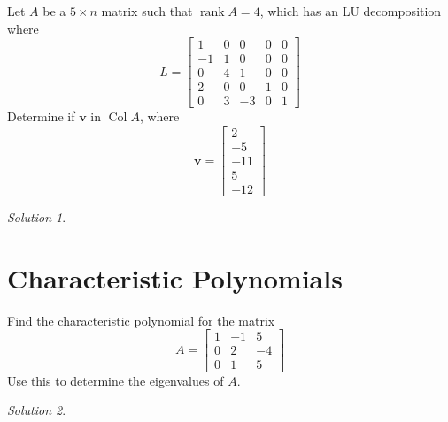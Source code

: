 \documentclass{article}
\newcommand{\vv}[1]{\mathbf{#1}}
\DeclareMathOperator{\col}{Col}
\DeclareMathOperator{\rank}{rank}
\theoremstyle{remark}
\newtheorem*{solution}{Solution}
\begin{document}
Let $A$ be a $5 \times n$ matrix such that $\rank A = 4$, which has an LU decomposition where
\begin{displaymath}
  L =
  \begin{bmatrix}
    1 & 0 & 0 & 0 & 0 \\
    -1 & 1 & 0 & 0 & 0\\
    0 & 4 & 1 & 0 & 0\\
    2 & 0 & 0 & 1 & 0 \\
    0 & 3 & -3 & 0 & 1
  \end{bmatrix}
\end{displaymath}
Determine if $\vv v$ in $\col A$, where
\begin{displaymath}
  \vv v =
  \begin{bmatrix}
    2 \\ -5 \\ -11 \\ 5 \\ -12
  \end{bmatrix}
\end{displaymath}

\begin{solution}
\end{solution}

\pagebreak
\section{Characteristic Polynomials}

Find the characteristic polynomial for the matrix
\begin{displaymath}
  A =
  \begin{bmatrix}
    1 & -1 & 5 \\
    0 & 2 & -4 \\
    0 & 1 & 5
  \end{bmatrix}
\end{displaymath}
Use this to determine the eigenvalues of $A$.

\begin{solution}
\end{solution}
\end{document}
